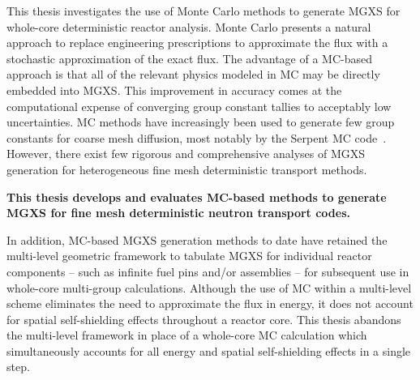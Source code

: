 
This thesis investigates the use of Monte Carlo methods to generate \ac{MGXS} for whole-core deterministic reactor analysis. Monte Carlo presents a natural approach to replace engineering prescriptions to approximate the flux with a stochastic approximation of the exact flux. The advantage of a \ac{MC}-based approach is that all of the relevant physics modeled in \ac{MC} may be directly embedded into \ac{MGXS}. This improvement in accuracy comes at the computational expense of converging group constant tallies to acceptably low uncertainties. \ac{MC} methods have increasingly been used to generate few group constants for coarse mesh diffusion, most notably by the Serpent \ac{MC} code~\cite{serpent2013manual}. However, there exist few rigorous and comprehensive analyses of \ac{MGXS} generation for heterogeneous fine mesh deterministic transport methods.

\begin{emphbox}
\textbf{This thesis develops and evaluates \ac{MC}-based methods to generate \ac{MGXS} for fine mesh deterministic neutron transport codes.}
\end{emphbox}

\vspace{-0.1in}

In addition, \ac{MC}-based \ac{MGXS} generation methods to date have retained the multi-level geometric framework to tabulate \ac{MGXS} for individual reactor components -- such as infinite fuel pins and/or assemblies -- for subsequent use in whole-core multi-group calculations. Although the use of \ac{MC} within a multi-level scheme eliminates the need to approximate the flux in energy, it does not account for spatial self-shielding effects throughout a reactor core. This thesis abandons the multi-level framework in place of a whole-core \ac{MC} calculation which simultaneously accounts for all energy and spatial self-shielding effects in a single step.

